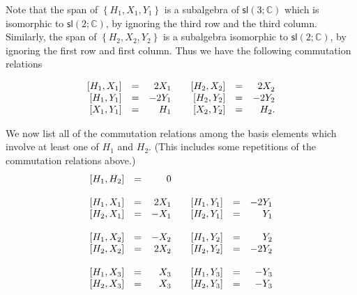 \documentclass{amsbook}
\theoremstyle{plain}
\numberwithin{equation}{chapter}
\numberwithin{theorem}{chapter}
\begin{document}
Note that the span of $\left\{  H_{1},X_{1},Y_{1}\right\}  $ is a subalgebra
of $\mathsf{sl}\left(  3;\mathbb{C}\right)  $ which is isomorphic to
$\mathsf{sl}(2;\mathbb{C})$, by ignoring the third row and the third column.
Similarly, the span of $\left\{  H_{2},X_{2},Y_{2}\right\}  $ is a subalgebra
isomorphic to $\mathsf{sl}(2;\mathbb{C})$, by ignoring the first row and first
column. Thus we have the following commutation relations%

\[%
\begin{array}
[c]{rrrrrrr}%
\left[  H_{1},X_{1}\right]  & = & 2X_{1} &  & \left[  H_{2},X_{2}\right]  &
= & 2X_{2}^{}\\
\left[  H_{1},Y_{1}\right]  & = & -2Y_{1} &  & \left[  H_{2},Y_{2}\right]  &
= & -2Y_{2}\\
\left[  X_{1},Y_{1}\right]  & = & H_{1} &  & \left[  X_{2},Y_{2}\right]  & = &
H_{2}\text{.}%
\end{array}
\]

We now list all of the commutation relations among the basis elements which
involve at least one of $H_{1}$ and $H_{2}$. (This includes some repetitions
of the commutation relations above.)
\begin{equation}%
\begin{array}
[c]{rrrrrrr}%
\left[  H_{1},H_{2}\right]  & = & 0 &  &  &  & \\
&  &  &  &  &  & \\
\left[  H_{1},X_{1}\right]  & = & 2X_{1} &  & \left[  H_{1},Y_{1}\right]  &
= & -2Y_{1}\\
\left[  H_{2},X_{1}\right]  & = & -X_{1} &  & \left[  H_{2},Y_{1}\right]  &
= & Y_{1}\\
&  &  &  &  &  & \\
\left[  H_{1},X_{2}\right]  & = & -X_{2} &  & \left[  H_{1},Y_{2}\right]  &
= & Y_{2}\\
\left[  H_{2},X_{2}\right]  & = & 2X_{2} &  & \left[  H_{2},Y_{2}\right]  &
= & -2Y_{2}\\
&  &  &  &  &  & \\
\left[  H_{1},X_{3}\right]  & = & X_{3} &  & \left[  H_{1},Y_{3}\right]  & = &
-Y_{3}\\
\left[  H_{2},X_{3}\right]  & = & X_{3} &  & \left[  H_{2},Y_{3}\right]  & = &
-Y_{3}%
\end{array}
\label{h.rel}%
\end{equation}
\end{document}
